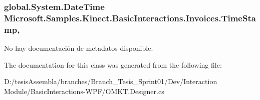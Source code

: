 \hypertarget{class_microsoft_1_1_samples_1_1_kinect_1_1_basic_interactions_1_1_invoices_a33fe77fbc92417ea7c7b4b9b4448774c}{
\subsubsection[{Time\-Stamp}]{\setlength{\rightskip}{0pt plus 5cm}global.\-System.\-Date\-Time Microsoft.\-Samples.\-Kinect.\-Basic\-Interactions.\-Invoices.\-Time\-Stamp\hspace{0.3cm}{\ttfamily [get]}, {\ttfamily [set]}}}\label{class_microsoft_1_1_samples_1_1_kinect_1_1_basic_interactions_1_1_invoices_a33fe77fbc92417ea7c7b4b9b4448774c}


No hay documentación de metadatos disponible. 



The documentation for this class was generated from the following file\-:\begin{DoxyCompactItemize}
\item 
D\-:/tesis\-Assembla/branches/\-Branch\-\_\-\-Tesis\-\_\-\-Sprint01/\-Dev/\-Interaction Module/\-Basic\-Interactions-\/\-W\-P\-F/O\-M\-K\-T.\-Designer.\-cs\end{DoxyCompactItemize}
